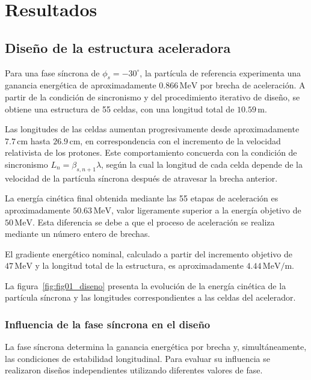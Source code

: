 \chapter{Resultados}

\section{Diseño de la estructura aceleradora}

Para una fase síncrona de $\phi_s=-30^\circ$, la partícula de referencia experimenta una ganancia energética de aproximadamente
$0.866\,\mathrm{MeV}$ por brecha de aceleración. A partir de la condición de sincronismo y del procedimiento iterativo de diseño, se obtiene una estructura de 55 celdas, con una longitud total de $10.59\,\mathrm{m}$.

Las longitudes de las celdas aumentan progresivamente desde aproximadamente $7.7\,\mathrm{cm}$ hasta $26.9\,\mathrm{cm}$, en correspondencia con el incremento de la velocidad relativista de los protones. Este comportamiento concuerda con la condición de sincronismo $L_n=\beta_{s,n+1}\lambda$, según la cual la longitud de cada celda depende de la velocidad de la partícula síncrona después de atravesar la brecha anterior.

La energía cinética final obtenida mediante las 55 etapas de aceleración es aproximadamente $50.63\,\mathrm{MeV}$, valor ligeramente superior a la energía objetivo de $50\,\mathrm{MeV}$. Esta diferencia se debe a que el proceso de aceleración se realiza mediante un número entero de brechas.

El gradiente energético nominal, calculado a partir del incremento objetivo de $47\,\mathrm{MeV}$ y la longitud total de la estructura, es aproximadamente $4.44\,\mathrm{MeV/m}$.

La figura~\ref{fig:fig01_diseno} presenta la evolución de la energía cinética de la partícula síncrona y las longitudes correspondientes a las celdas del acelerador.

\subsection{Influencia de la fase síncrona en el diseño}

La fase síncrona determina la ganancia energética por brecha y, simultáneamente, las condiciones de estabilidad longitudinal. Para evaluar su influencia se realizaron diseños independientes utilizando diferentes valores de fase.


